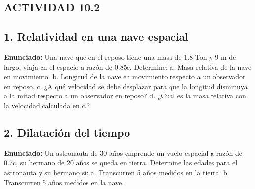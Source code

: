 \documentclass[12pt, letterpaper]{article}
\begin{document}
\subsection*{ACTIVIDAD 10.2}

\subsection*{1. Relatividad en una nave espacial}
\noindent \textbf{Enunciado:} Una nave que en el reposo tiene una masa de 1.8 Ton y 9 m de largo, viaja en el espacio a razón de 0.85c. Determine: a. Masa relativa de la nave en movimiento. b. Longitud de la nave en movimiento respecto a un observador en reposo. c. ¿A qué velocidad se debe desplazar para que la longitud disminuya a la mitad respecto a un observador en reposo? d. ¿Cuál es la masa relativa con la velocidad calculada en c.? %


\subsection*{2. Dilatación del tiempo}
\noindent \textbf{Enunciado:} Un astronauta de 30 años emprende un vuelo espacial a razón de 0.7c, su hermano de 20 años se queda en tierra. Determine las edades para el astronauta y su hermano si: a. Transcurren 5 años medidos en la tierra. b. Transcurren 5 años medidos en la nave. %
\end{document}
